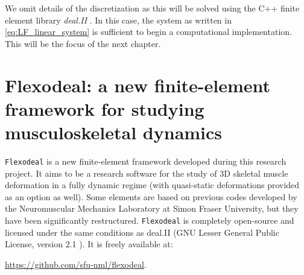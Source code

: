 \documentclass{sfuthesis}
\numberwithin{equation}{section}
\numberwithin{figure}{chapter}
\numberwithin{table}{chapter}
\theoremstyle{definition}
\begin{document}
We omit details of the discretization as this will be solved using the C++ finite element library \textit{deal.II} \cite{dealii}. In this case, the system as written in \eqref{eq:LF_linear_system} is sufficient to begin a computational implementation. This will be the focus of the next chapter.


\chapter{Flexodeal: a new finite-element framework for studying musculoskeletal dynamics} \label{ch:flexodeal}

\texttt{Flexodeal} is a new finite-element framework developed during this research project. It aims to be a research software for the study of 3D skeletal muscle deformation in a fully dynamic regime (with quasi-static deformations provided as an option as well). Some elements are based on previous codes developed by the Neuromuscular Mechanics Laboratory at Simon Fraser University, but they have been significantly restructured. \texttt{Flexodeal} is completely open-source and licensed under the same conditions as deal.II (GNU Lesser General Public License, version 2.1 \cite{dealii}). It is freely available at:
\begin{center}
    \url{https://github.com/sfu-nml/flexodeal}.
\end{center}
\end{document}
